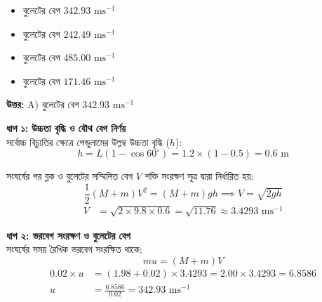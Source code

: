 \documentclass[12pt, a4paper]{article}
\begin{document}
{{%
\begin{itemize}[label={}, leftmargin=1cm, itemsep=0.5em]
    \item[\textbf{A)}] বুলেটের বেগ $342.93\text{ ms}^{-1}$
    \item[\textbf{B)}] বুলেটের বেগ $242.49\text{ ms}^{-1}$
    \item[\textbf{C)}] বুলেটের বেগ $485.00\text{ ms}^{-1}$
    \item[\textbf{D)}] বুলেটের বেগ $171.46\text{ ms}^{-1}$
\end{itemize}

\vspace{0.5em}
\begin{tcolorbox}[answerbox]
    \textbf{\color{success} উত্তর:} A) বুলেটের বেগ $342.93\text{ ms}^{-1}$
\end{tcolorbox}
\vspace{1em}

\begin{tcolorbox}[solutionbox={সমাধান (Solution)}]
    \noindent
    \textbf{ধাপ ১: উচ্চতা বৃদ্ধি ও যৌথ বেগ নির্ণয়} \\
    সর্বোচ্চ বিচ্যুতির ক্ষেত্রে পেন্ডুলামের উল্লম্ব উচ্চতা বৃদ্ধি ($h$):
    \[ h = L (1 - \cos 60^\circ) = 1.2 \times (1 - 0.5) = 0.6\text{ m} \]
    
    সংঘর্ষের পর ব্লক ও বুলেটের সম্মিলিত বেগ $V$ শক্তি সংরক্ষণ সূত্র দ্বারা নির্ধারিত হয়:
    \[ \frac{1}{2} (M + m) V^2 = (M + m) g h \implies V = \sqrt{2gh} \]
    \begin{align*}
        V &= \sqrt{2 \times 9.8 \times 0.6} = \sqrt{11.76} \approx 3.4293\text{ ms}^{-1}
    \end{align*}
    
    \vspace{0.5em}
    \noindent\textbf{ধাপ ২: ভরবেগ সংরক্ষণ ও বুলেটের বেগ} \\
    সংঘর্ষের সময় রৈখিক ভরবেগ সংরক্ষিত থাকে:
    \[ m u = (M + m) V \]
    \begin{align*}
        0.02 \times u &= (1.98 + 0.02) \times 3.4293 = 2.00 \times 3.4293 = 6.8586 \\
        u &= \frac{6.8586}{0.02} = \mathbf{342.93}\text{ ms}^{-1}
    \end{align*}
\end{tcolorbox}

}}
\end{document}
